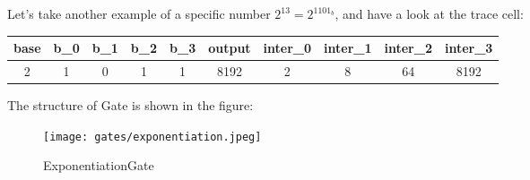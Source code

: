 Let's take another example of a specific number $2^13 = 2^{1101_b}$, and have a look at the trace cell:
\begin{center}
    \begin{tabular}{ |c|c|c|c|c|c|c|c|c|c| }
        \hline
        base & b\_0 & b\_1 & b\_2 & b\_3 & output & inter\_0 & inter\_1 & inter\_2 & inter\_3 \\
        \hline
        2 & 1 & 0 & 1 & 1 & 8192 & 2 & 8 & 64 & 8192 \\
        \hline
    \end{tabular}
\end{center}

The structure of Gate is shown in the figure:
\begin{figure}[!h]
    \centering
    \texttt{[image: gates/exponentiation.jpeg]}
    \caption{ExponentiationGate}
    \label{fig:exponetiation-gate}
\end{figure}